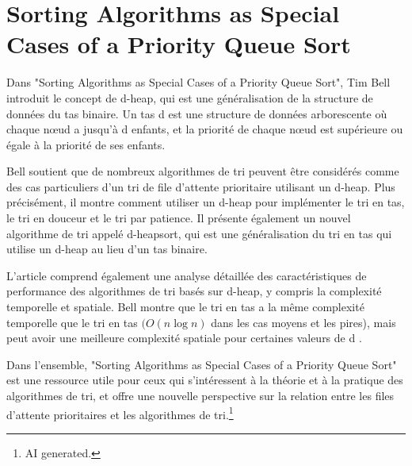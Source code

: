 \documentclass{article}
\begin{document}
    \section{Sorting Algorithms as Special Cases of a Priority Queue Sort}
        Dans "Sorting Algorithms as Special Cases of a Priority Queue Sort", Tim Bell introduit le concept de d-heap, qui est une généralisation de la structure de données du tas binaire. Un tas d est une structure de données arborescente où chaque nœud a jusqu'à d enfants, et la priorité de chaque nœud est supérieure ou égale à la priorité de ses enfants.

        Bell soutient que de nombreux algorithmes de tri peuvent être considérés comme des cas particuliers d'un tri de file d'attente prioritaire utilisant un d-heap. Plus précisément, il montre comment utiliser un d-heap pour implémenter le tri en tas, le tri en douceur et le tri par patience. Il présente également un nouvel algorithme de tri appelé d-heapsort, qui est une généralisation du tri en tas qui utilise un d-heap au lieu d'un tas binaire.

        L'article comprend également une analyse détaillée des caractéristiques de performance des algorithmes de tri basés sur d-heap, y compris la complexité temporelle et spatiale. Bell montre que le tri en tas a la même complexité temporelle que le tri en tas $ ( O ( n \log n )$ dans les cas moyens et les pires), mais peut avoir une meilleure complexité spatiale pour certaines valeurs de d .

        Dans l'ensemble, "Sorting Algorithms as Special Cases of a Priority Queue Sort" est une ressource utile pour ceux qui s'intéressent à la théorie et à la pratique des algorithmes de tri, et offre une nouvelle perspective sur la relation entre les files d'attente prioritaires et les algorithmes de tri.\footnote{AI generated.}

        

        \newpage 
\end{document}

